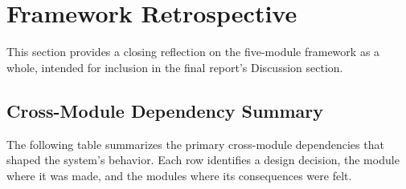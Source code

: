\documentclass[11pt,letterpaper]{article}
\begin{document}
	\newpage
	\section{Framework Retrospective}

	This section provides a closing reflection on the five-module framework as a whole, intended for inclusion in the final report's Discussion section.

	\subsection{Cross-Module Dependency Summary}

	The following table summarizes the primary cross-module dependencies that shaped the system's behavior. Each row identifies a design decision, the module where it was made, and the modules where its consequences were felt.
\end{document}
